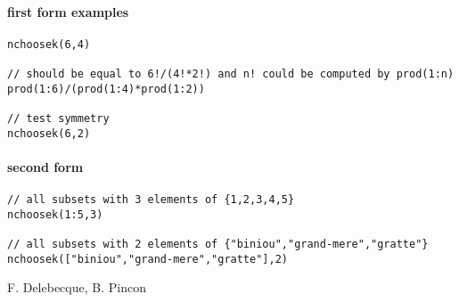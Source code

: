 \begin{examples}
\paragraph{first form examples}
\begin{Verbatim}
nchoosek(6,4)

// should be equal to 6!/(4!*2!) and n! could be computed by prod(1:n)
prod(1:6)/(prod(1:4)*prod(1:2))

// test symmetry
nchoosek(6,2)
\end{Verbatim}
\end{examples}

\begin{examples}
\paragraph{second form}
\begin{Verbatim}
// all subsets with 3 elements of {1,2,3,4,5}
nchoosek(1:5,3)

// all subsets with 2 elements of {"biniou","grand-mere","gratte"}
nchoosek(["biniou","grand-mere","gratte"],2)
\end{Verbatim}
\end{examples}


\begin{manseealso}
\end{manseealso}

\begin{authors}
F. Delebecque, B. Pincon
\end{authors}


